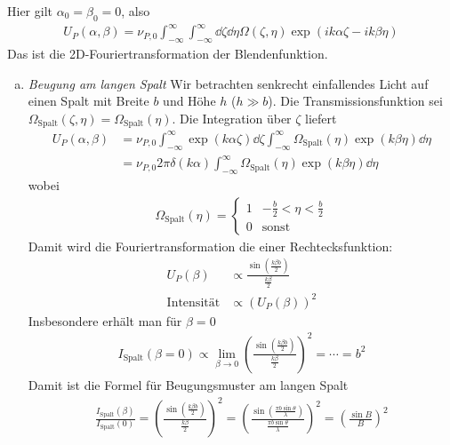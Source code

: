 Hier gilt $\alpha_0=\beta_0=0$, also
\begin{gather*}
  U_P(\alpha,\beta) 
  = \nu_{P,0} \int_{-\infty}^{\infty}\int_{-\infty}^{\infty}
  \dd\zeta\dd\eta \Omega(\zeta,\eta)
  \exp\left( ik\alpha\zeta - ik\beta\eta \right)
\end{gather*}
Das ist die 2D-Fouriertransformation der Blendenfunktion.

\begin{enumerate}[a)]
\item \emph{Beugung am langen Spalt}
  Wir betrachten senkrecht einfallendes Licht auf einen Spalt mit Breite
  $b$ und Höhe $h$ ($h\gg b$). Die Transmissionsfunktion sei 
  $\Omega_\text{Spalt}(\zeta,\eta) = \Omega_\text{Spalt}(\eta)$.
  Die Integration über $\zeta$ liefert
  \begin{align*}
    U_P(\alpha,\beta) 
    &= \nu_{P,0} 
      \int_{-\infty}^{\infty} \exp(k\alpha\zeta)\dd\zeta
      \int_{-\infty}^{\infty} \Omega_\text{Spalt}(\eta)\exp(k\beta\eta)\dd\eta\\
    &= \nu_{P,0} 2\pi\delta(k\alpha)
      \int_{-\infty}^{\infty} \Omega_\text{Spalt}(\eta)\exp(k\beta\eta)\dd\eta
  \end{align*}
  wobei
  \begin{gather*}
    \Omega_\text{Spalt}(\eta) = 
    \begin{cases}
      1 & -\frac{b}{2} < \eta < \frac{b}{2}\\
      0 & \text{sonst}
    \end{cases}
  \end{gather*}
  Damit wird die Fouriertransformation die einer Rechtecksfunktion:
  \begin{align*}
    U_P(\beta) 
    &\propto \frac{\sin(\frac{k\beta b}{2})}{\frac{k\beta}{2}}\\
    \text{Intensität}
    &\propto (U_P(\beta))^2
  \end{align*}
  Insbesondere erhält man für $\beta=0$ 
  \begin{gather*}
    I_\text{Spalt}(\beta=0) 
    \propto \lim_{\beta\to0} \left(
      \frac{\sin(\frac{k\beta b}{2})}{\frac{k\beta}{2}}
    \right)^2
    = \dotsb = b^2
  \end{gather*}
  Damit ist die Formel für Beugungsmuster am langen Spalt
  \begin{gather*}
    \frac{I_\text{Spalt}(\beta)}{I_\text{Spalt}(0)}
    = \left(
      \frac{\sin(\frac{k\beta b}{2})}{\frac{k\beta}{2}}
    \right)^2
    = \left(
      \frac{\sin(\frac{\pi b\sin\theta}{\lambda})}
      {\frac{\pi b\sin\theta}{\lambda}}
    \right)^2
    = \left(\frac{\sin B}{B}\right)^2
  \end{gather*}


\end{enumerate}
